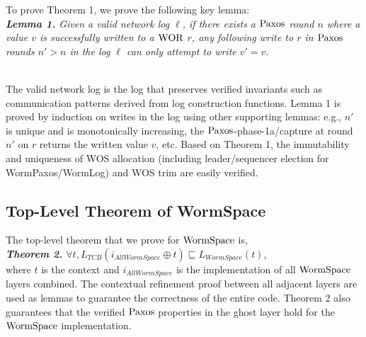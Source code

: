 \noindent To prove Theorem 1, we prove the following key lemma: 
\\
\textit{\textbf{Lemma 1.} Given a valid network log $\ell$, if there exists a $\mathrm{Paxos}$ round $n$ where a value $v$ is successfully written to a $\mathrm{WOR}$ $r$, any following write to $r$ in $\mathrm{Paxos}$ rounds $n' > n$ in the log $\ell$
can only attempt to write $v' = v$.}

\noindent\\
	The valid network log is the log that preserves verified invariants such as communication patterns derived from log construction functions.
Lemma 1 is proved by induction on writes in the log using other supporting lemmas: e.g., $n'$ is unique and is monotonically increasing, the $\mathrm{Paxos}$-phase-1a/capture at round $n'$ on $r$ returns the written value $v$, etc.
Based on Theorem 1, the immutability and uniqueness of WOS allocation (including leader/sequencer election for WormPaxos/WormLog) and WOS trim are easily verified. 




\subsection{Top-Level Theorem of WormSpace}
	The top-level theorem that we prove for $\mathrm{WormSpace}$ is, \\
\textit{\textbf{Theorem 2.} $\forall t, L_{TCB} (i_{AllWormSpace} \oplus t) \sqsubseteq L_{WormSpace} (t)$}, \\
where $t$ is the context and $i_{AllWormSpace}$ is the implementation of all $\mathrm{WormSpace}$ layers combined. The contextual refinement proof between all adjacent layers are used as lemmas to guarantee the correctness of the entire code. Theorem 2 also guarantees that the verified $\mathrm{Paxos}$ properties in the ghost layer hold for the $\mathrm{WormSpace}$ implementation.



